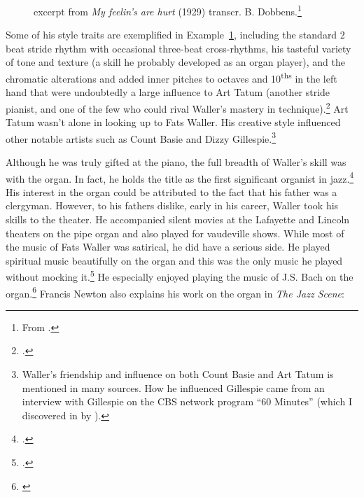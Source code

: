 \documentclass[11pt]{report}
\begin{document}
	
		\begin{figure}[ht]
			\centering
			\begin{minipage}{\textwidth}
				
				\caption{excerpt from \emph{My feelin's are hurt} (1929) transcr. B. Dobbens.\protect\footnote{\scriptsize From \cite[]{grove-book:waller}.}}
				\label{fig:hurt}
				

				{%
\parindent 0pt
\ifx\preLilyPondExample \undefined
\else
  \expandafter\preLilyPondExample
\fi
\def\lilypondbook{}%

\ifx\postLilyPondExample \undefined
\else
  \expandafter\postLilyPondExample
\fi
}


			\end{minipage}
		\end{figure}


	Some of his style traits are exemplified in Example~\ref{fig:hurt}, including the standard 2 beat stride rhythm with occasional three-beat cross-rhythms, his tasteful variety of tone and texture (a skill he probably developed as an organ player), and the chromatic alterations and added inner pitches to octaves and 10\textsuperscript{ths} in the left hand that were undoubtedly a large influence to Art Tatum (another stride pianist, and one of the few who could rival Waller's mastery in technique).\footnote{\cite[40]{grove-book:waller}.} Art Tatum wasn't alone in looking up to Fats Waller. His creative style influenced other notable artists such as Count Basie and Dizzy Gillespie.\footnote{Waller's friendship and influence on both Count Basie and Art Tatum is mentioned in many sources. How he influenced Gillespie came from an interview with Gillespie on the CBS network program ``60 Minutes'' (which I discovered in  by \cite{transcriptions}).}

	\label{sec:organ_and_classical}
	Although he was truly gifted at the piano, the full breadth of Waller's skill was with the organ. In fact, he holds the title as the first significant organist in jazz.\footnote{\cite[40]{grove-book:waller}.} His interest in the organ could be attributed to the fact that his father was a clergyman. However, to his fathers dislike, early in his career, Waller took his skills to the theater. He accompanied silent movies at the Lafayette and Lincoln theaters on the pipe organ and also played for vaudeville shows. While most of the music of Fats Waller was satirical, he did have a serious side. He played spiritual music beautifully on the organ and this was the only music he played without mocking it.\footnote{\cite[8]{outside-insider}.} He especially enjoyed playing the music of J.S. Bach on the organ.\footnote{\cite[143]{visions}} Francis Newton also explains his work on the organ in \emph{The Jazz Scene}:
\end{document}
